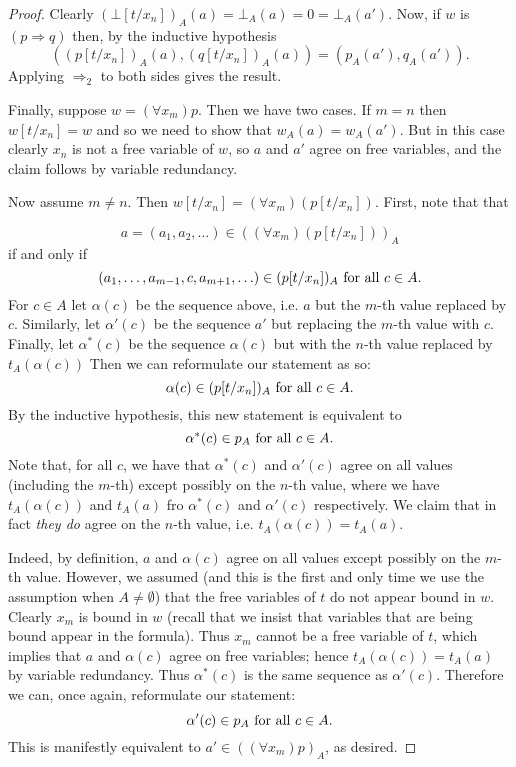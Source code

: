 \documentclass{report}
\theoremstyle{definition}
\theoremstyle{plain}
\theoremstyle{definition}
\begin{document}
\begin{proof}
		Clearly $(\bot[t/x_n])_A(a) = \bot_A (a) = 0 = \bot_A(a')$. Now, if $w$ is $(p\Rightarrow q)$ then, by the inductive hypothesis
		\[
		((p[t/x_n])_A(a), (q[t/x_n])_A(a)) = (p_A(a'),q_A(a')).
		\]
		Applying $\Rightarrow_2$ to both sides gives the result.
		
		Finally, suppose $w = (\forall x_m) p$. Then we have two cases. If $m = n$ then $w[t/x_n] = w$ and so we need to show that $w_A(a) = w_A(a')$. But in this case clearly $x_n$ is not a free variable of $w$, so $a$ and $a'$ agree on free variables, and the claim follows by variable redundancy.
		
		Now assume $m\neq n$. Then $w[t/x_n] = (\forall x_m) (p[t/x_n])$. First, note that that 
		
		\[a = (a_1,a_2,\ldots)\in ((\forall x_m) (p[t/x_n]))_A\]
		if and only if
		\[
		(a_1,\ldots, a_{m-1}, c,a_{m+1},\ldots)\in (p[t/x_n])_A \textnormal{ for all }c\in A. 
		\]
		For $c\in A$ let $\alpha(c)$ be the sequence above, i.e. $a$ but the $m$-th value replaced by $c$. Similarly, let $\alpha'(c)$ be the sequence $a'$ but replacing the $m$-th value with $c$. Finally, let $\alpha^*(c)$ be the sequence $\alpha(c)$ but with the $n$-th value replaced by $t_A(\alpha(c))$ Then we can reformulate our statement as so:
		\[
		\alpha(c) \in (p[t/x_n])_A \textnormal{ for all }c\in A.
		\]
		By the inductive hypothesis, this new statement is equivalent to
		\[
		\alpha^*(c) \in p_A \textnormal{ for all }c\in A.
		\]
		Note that, for all $c$, we have that $\alpha^*(c)$ and $\alpha'(c)$ agree on all values (including the $m$-th) except possibly on the $n$-th value, where we have $t_A(\alpha(c))$ and $t_A(a)$ fro $\alpha^*(c)$ and $\alpha'(c)$ respectively. We claim that in fact \emph{they do} agree on the $n$-th value, i.e. $t_A(\alpha(c)) = t_A(a)$.
		
		Indeed, by definition, $a$ and $\alpha(c)$ agree on all values except possibly on the $m$-th value. However, we assumed (and this is the first and only time we use the assumption when $A\neq \emptyset$) that the free variables of $t$ do not appear bound in $w$. Clearly $x_m$ is bound in $w$ (recall that we insist that variables that are being bound appear in the formula). Thus $x_m$ cannot be a free variable of $t$, which implies that $a$ and $\alpha(c)$ agree on free variables; hence $t_A(\alpha(c)) = t_A(a)$ by variable redundancy. Thus $\alpha^*(c)$ is the same sequence as $\alpha'(c)$. Therefore we can, once again, reformulate our statement:
		\[
		\alpha'(c) \in p_A \textnormal{ for all }c\in A.
		\]
		This is manifestly equivalent to $a'\in((\forall x_m)p)_A$, as desired.
	\end{proof}
	
\end{document}
